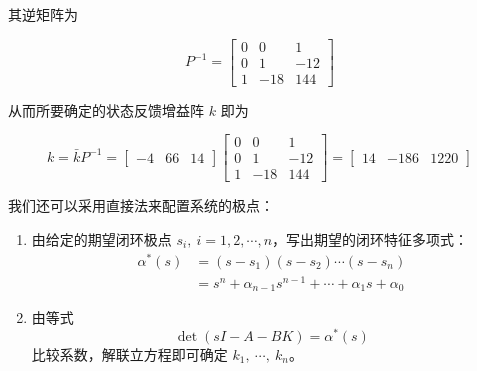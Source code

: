\begin{example}
    其逆矩阵为

    \[
    P^{-1}=
    \begin{bmatrix}
    0 & 0 & 1\\
    0 & 1 & -12\\
    1 & -18 & 144
    \end{bmatrix}
    \]

    从而所要确定的状态反馈增益阵 $k$ 即为

    \[
    k=\bar{k}P^{-1}
    =
    \begin{bmatrix}
    -4 & 66 & 14
    \end{bmatrix}
    \begin{bmatrix}
    0 & 0 & 1\\
    0 & 1 & -12\\
    1 & -18 & 144
    \end{bmatrix}
    =
    \begin{bmatrix}
    14 & -186 & 1220
    \end{bmatrix}
    \]
\end{example}

我们还可以采用直接法来配置系统的极点：
\begin{anymark}[状态反馈极点配置直接法]
    \begin{enumerate}[label=\textbf{第 \arabic* 步：}, leftmargin=*]
        \item 由给定的期望闭环极点
        $s_i,\ i=1,2,\cdots,n$，写出期望的闭环特征多项式：
        \[
        \begin{aligned}
        \alpha^*(s)
        &=(s-s_1)(s-s_2)\cdots(s-s_n) \\
        &=s^n+\alpha_{n-1}s^{n-1}+\cdots+\alpha_1s+\alpha_0
        \end{aligned}
        \]

        \item 由等式
        \[
        \det(sI-A-BK)=\alpha^*(s)
        \]
        比较系数，解联立方程即可确定
        $k_1,\ \cdots,\ k_n$。
    \end{enumerate}
\end{anymark}

